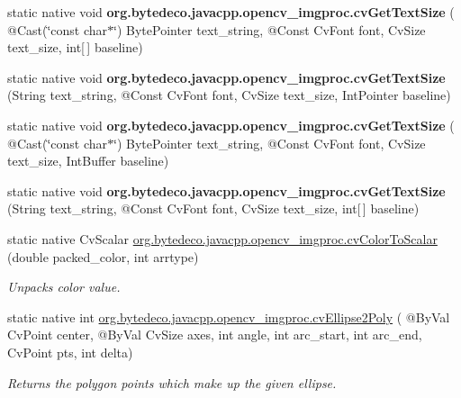 \begin{DoxyCompactItemize}
static native void {\bfseries org.\+bytedeco.\+javacpp.\+opencv\+\_\+imgproc.\+cv\+Get\+Text\+Size} ( @Cast(\char`\"{}const char$\ast$\char`\"{}) Byte\+Pointer text\+\_\+string, @Const Cv\+Font font, Cv\+Size text\+\_\+size, int\mbox{[}$\,$\mbox{]} baseline)
\item 
\mbox{\label{group__imgproc__c_gab09654e77492b8b291e74c8ae2648357}} 
static native void {\bfseries org.\+bytedeco.\+javacpp.\+opencv\+\_\+imgproc.\+cv\+Get\+Text\+Size} (String text\+\_\+string, @Const Cv\+Font font, Cv\+Size text\+\_\+size, Int\+Pointer baseline)
\item 
\mbox{\label{group__imgproc__c_gaadc26b063f8f5bfdb6f4e79ca36acada}} 
static native void {\bfseries org.\+bytedeco.\+javacpp.\+opencv\+\_\+imgproc.\+cv\+Get\+Text\+Size} ( @Cast(\char`\"{}const char$\ast$\char`\"{}) Byte\+Pointer text\+\_\+string, @Const Cv\+Font font, Cv\+Size text\+\_\+size, Int\+Buffer baseline)
\item 
\mbox{\label{group__imgproc__c_ga724f3548216b44a666cb9f11daa23bfe}} 
static native void {\bfseries org.\+bytedeco.\+javacpp.\+opencv\+\_\+imgproc.\+cv\+Get\+Text\+Size} (String text\+\_\+string, @Const Cv\+Font font, Cv\+Size text\+\_\+size, int\mbox{[}$\,$\mbox{]} baseline)
\item 
static native Cv\+Scalar \hyperlink{group__imgproc__c_ga740bdb87be7fa22bb0fda2e620a13777}{org.\+bytedeco.\+javacpp.\+opencv\+\_\+imgproc.\+cv\+Color\+To\+Scalar} (double packed\+\_\+color, int arrtype)
\begin{DoxyCompactList}\small\item\em Unpacks color value. \end{DoxyCompactList}\item 
static native int \hyperlink{group__imgproc__c_ga4636892155a3d693c0906197d7777d0c}{org.\+bytedeco.\+javacpp.\+opencv\+\_\+imgproc.\+cv\+Ellipse2\+Poly} ( @By\+Val Cv\+Point center, @By\+Val Cv\+Size axes, int angle, int arc\+\_\+start, int arc\+\_\+end, Cv\+Point pts, int delta)
\begin{DoxyCompactList}\small\item\em Returns the polygon points which make up the given ellipse. \end{DoxyCompactList}\item 
\mbox{\label{group__imgproc__c_ga6d77dd413c0c082e8d61980fd40a306c}} 

\end{DoxyCompactItemize}
